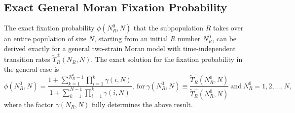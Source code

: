 \documentclass{article}
\begin{document}
\subsection{Exact General Moran Fixation Probability}\label{A1}

The exact fixation probability $\phi\left(N_R^0,N\right)$ that the subpopulation \(R\) takes over an entire population of size $N$, starting from an initial $R$ number \(N_R^0\), can be derived exactly for a general two-strain Moran model with time-independent transition rates \(\widetilde{T}^{\pm}_R\left(N_R,N\right)\). The exact solution for the fixation probability in the general case is~\cite{Gardiner, VanKampen, Ewens, antal2006fixation, traulsen2009stochastic}
\begin{equation}
    \phi\left(N_R^0,N\right)=\frac{1+\sum_{k=1}^{N_R^0-1}\prod_{i=1}^{k}\gamma\left(i,N\right)}{1+\sum_{k=1}^{N-1}\prod_{i=1}^{k}\gamma\left(i,N\right)},~\text{for}~\gamma\left(N_R^0,N\right)\equiv\frac{\widetilde{T}^-_R\left(N_R^0,N\right)}{\widetilde{T}^+_R\left(N_R^0,N\right)}~\text{and}~N_R^0=1, 2,..., N,
    \label{SuppEq:GenFixProb}
\end{equation}
where the factor \(\gamma\left(N_R,N\right)\) fully determines the above result.
\end{document}
